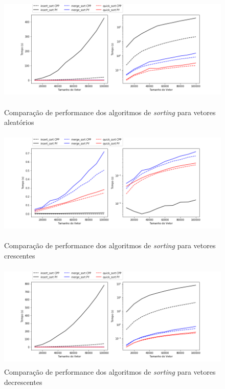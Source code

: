 \documentclass{article}
\begin{document}
  \begin{figure}[!h]
  \centering
  \includegraphics[width=0.8\linewidth,height=5cm]{SortTime_Random.png}
    \caption{Comparação de performance dos algoritmos de {\it sorting} para vetores aleatórios}
    \vspace{0.5cm}
  \includegraphics[width=0.8\linewidth,height=5cm]{SortTime_Ascending.png}
    \caption{Comparação de performance dos algoritmos de {\it sorting} para vetores crescentes}
    \vspace{0.5cm}
  \includegraphics[width=0.8\linewidth,height=5cm]{SortTime_Descending.png}
    \caption{Comparação de performance dos algoritmos de {\it sorting} para vetores decrescentes}
  \end{figure}

\end{document}
